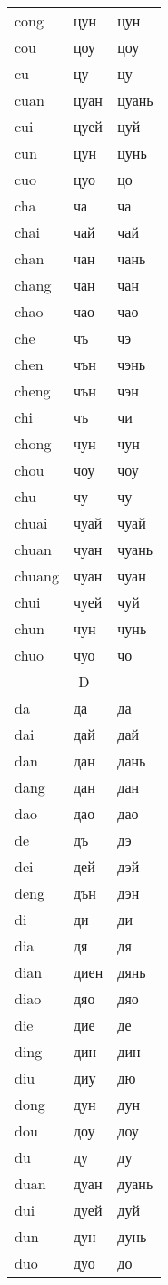 \begin{longtable}{|l|l|l|}
\\    cong &цун &цун
\\    cou &цоу &цоу
\\    cu &цу &цу
\\    cuan &цуан &цуань
\\    cui &цуей &цуй
\\    cun &цун &цунь
\\    cuo &цуо &цо
\\    cha &ча &ча
\\    chai &чай &чай
\\    chan &чан &чань
\\    chang &чан &чан
\\    chao &чао &чао
\\    che &чъ &чэ
\\    chen &чън &чэнь
\\    cheng &чън &чэн
\\    chi &чъ &чи
\\    chong &чун &чун
\\    chou &чоу &чоу
\\    chu &чу &чу
\\    chuai &чуай &чуай
\\    chuan &чуан &чуань
\\    chuang &чуан &чуан
\\    chui &чуей &чуй
\\    chun &чун &чунь
\\    chuo &чуо &чо
\\    
\hline

\multicolumn{3}{|c|}{D} \\
\hline
da &да &да
\\dai &дай &дай
\\dan &дан &дань
\\dang &дан &дан
\\dao &дао &дао
\\de &дъ &дэ
\\dei &дей &дэй
\\deng &дън &дэн
\\di &ди &ди
\\dia &дя &дя
\\dian &диен &дянь
\\diao &дяо &дяо
\\die &дие &де
\\ding &дин &дин
\\diu &диу &дю
\\dong &дун &дун
\\dou &доу &доу
\\du &ду &ду
\\duan &дуан &дуань
\\dui &дуей &дуй
\\dun &дун &дунь
\\duo &дуо &до
\\
\hline


\end{longtable}
